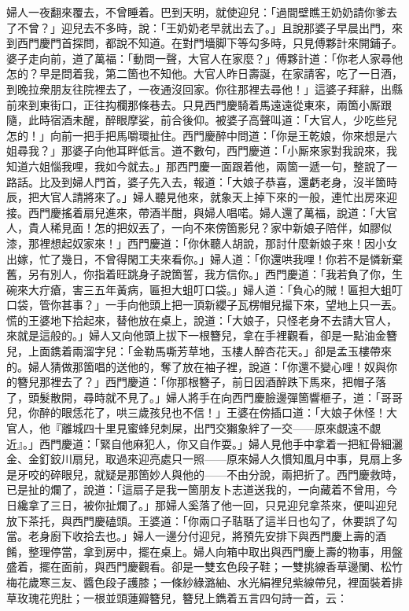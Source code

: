 婦人一夜翻來覆去，不曾睡着。巴到天明，就使迎兒：「過間壁瞧王奶奶請你爹去了不曾？」迎兒去不多時，說：「王奶奶老早就出去了。」且說那婆子早晨出門，來到西門慶門首探問，都說不知道。在對門墻脚下等勾多時，只見傅夥計來開鋪子。婆子走向前，道了萬福：「動問一聲，大官人在家麼？」傅夥計道：「你老人家尋他怎的？早是問着我，第二箇也不知他。大官人昨日壽誕，在家請客，吃了一日酒，到晚拉衆朋友往院裡去了，一夜通沒回家。你往那裡去尋他！」這婆子拜辭，出縣前來到東街口，正往抅欄那條巷去。只見西門慶騎着馬遠遠從東來，兩箇小厮跟隨，此時宿酒未醒，醉眼摩娑，前合後仰。被婆子高聲叫道：「大官人，少吃些兒怎的！」向前一把手把馬嚼環扯住。西門慶醉中問道：「你是王乾娘，你來想是六姐尋我？」那婆子向他耳畔低言。道不數句，西門慶道：「小厮來家對我說來，我知道六姐惱我哩，我如今就去。」那西門慶一面跟着他，兩箇一遞一句，整說了一路話。比及到婦人門首，婆子先入去，報道：「大娘子恭喜，還虧老身，沒半箇時辰，把大官人請將來了。」婦人聽見他來，就象天上掉下來的一般，連忙出房來迎接。西門慶搖着扇兒進來，帶酒半酣，與婦人唱喏。婦人還了萬福，說道：「大官人，貴人稀見面！怎的把奴丟了，一向不來傍箇影兒？家中新娘子陪伴，如膠似漆，那裡想起奴家來！」西門慶道：「你休聽人胡說，那討什麼新娘子來！因小女出嫁，忙了幾日，不曾得閑工夫來看你。」婦人道：「你還哄我哩！你若不是憐新棄舊，另有別人，你指着旺跳身子說箇誓，我方信你。」西門慶道：「我若負了你，生碗來大疔瘡，害三五年黃病，匾担大蛆叮口袋。」婦人道：「負心的賊！匾担大蛆叮口袋，管你甚事？」一手向他頭上把一頂新纓子瓦楞帽兒撮下來，望地上只一丟。慌的王婆地下拾起來，替他放在桌上，說道：「大娘子，只怪老身不去請大官人，來就是這般的。」婦人又向他頭上拔下一根簪兒，拿在手裡觀看，卻是一點油金簪兒，上面鎸着兩溜字兒：「金勒馬嘶芳草地，玉樓人醉杏花天。」{}卻是孟玉樓帶來的。婦人猜做那箇唱的送他的，奪了放在袖子裡，說道：「你還不變心哩！奴與你的簪兒那裡去了？」西門慶道：「你那根簪子，前日因酒醉跌下馬來，把帽子落了，頭髮散開，尋時就不見了。」婦人將手在向西門慶臉邊彈箇響榧子，道：「哥哥兒，你醉的眼恁花了，哄三歲孩兒也不信！」王婆在傍插口道：「大娘子休怪！大官人，他『離城四十里見蜜蜂兒刺屎，出門交獺象絆了一交——原來覷遠不覷近』。」{}西門慶道：「緊自他麻犯人，你又自作耍。」婦人見他手中拿着一把紅骨細灑金、金釘鉸川扇兒，取過來迎亮處只一照——原來婦人久慣知風月中事，見扇上多是牙咬的碎眼兒，就疑是那箇妙人與他的——不由分說，兩把折了。西門慶救時，已是扯的爛了，說道：「這扇子是我一箇朋友卜志道送我的，{}一向藏着不曾用，今日纔拿了三日，被你扯爛了。」那婦人奚落了他一回，只見迎兒拿茶來，便叫迎兒放下茶托，與西門慶磕頭。王婆道：「你兩口子聐聒了這半日也勾了，休要誤了勾當。老身廚下收拾去也。」婦人一邊分付迎兒，將預先安排下與西門慶上壽的酒餚，整理停當，拿到房中，擺在桌上。婦人向箱中取出與西門慶上壽的物事，用盤盛着，擺在面前，與西門慶觀看。卻是一雙玄色段子鞋；一雙挑線香草邊闌、松竹梅花歲寒三友、醬色段子護膝；一條紗綠潞紬、水光絹裡兒紫線帶兒，裡面裝着排草玫瑰花兜肚；一根並頭蓮瓣簪兒，簪兒上鐫着五言四句詩一首，云：

